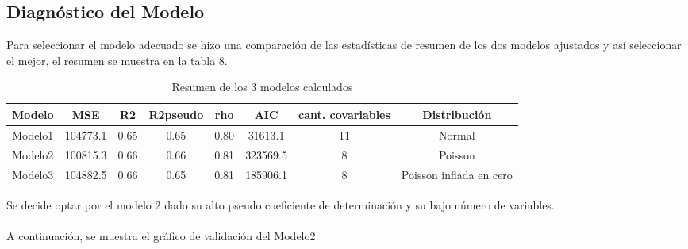\documentclass[11pt,twoside]{article}
\begin{document}
\begin{table}[H]
\caption{\small{Resumen del modelo2}}
\end{table}

\begin{table}[H]
\caption{\small{Resumen del modelo3}}
\end{table}






\subsection{Diagnóstico del Modelo}
\noindent
Para seleccionar el modelo adecuado se hizo una comparación de las estadísticas de resumen de los dos modelos ajustados y así seleccionar el mejor, el resumen se muestra en la tabla 8. 


\begin{table}[H]
\caption{\small{Resumen de los 3 modelos calculados}}
\begin{tabular}{@{}cccccccc@{}}
\toprule
Modelo  & MSE      & R2   & R2pseudo & rho  & AIC      & cant. covariables & Distribución            \\ \midrule
Modelo1 & 104773.1 & 0.65 & 0.65     & 0.80 & 31613.1  & 11                & Normal                  \\
Modelo2 & 100815.3 & 0.66 & 0.66     & 0.81 & 323569.5 & 8                 & Poisson                 \\
Modelo3 & 104882.5 & 0.66 & 0.65     & 0.81 & 185906.1 & 8                 & Poisson inflada en cero \\ \bottomrule
\end{tabular}
\end{table}
\noindent
Se decide optar por el modelo 2 dado su alto pseudo coeficiente de determinación y su bajo número de variables.
\\
\\
A continuación, se muestra el gráfico de validación del Modelo2
\end{document}
